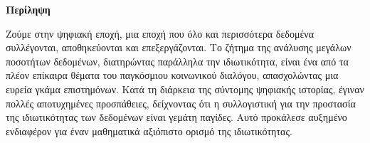 \documentclass[a4paper, 11pt, twoside]{Thesis}  %
\begin{document}
 
 
 
 
 
 

\clearpage  %
\newpage
\thispagestyle{empty}
\mbox{}





\null\vfill

\begin{center}
    \textbf{\Large{Περίληψη}}
\end{center}

Ζούμε στην ψηφιακή εποχή, μια εποχή που όλο και περισσότερα δεδομένα συλλέγονται, αποθηκεύονται και επεξεργάζονται. 
Το ζήτημα της ανάλυσης μεγάλων ποσοτήτων δεδομένων, διατηρώντας παράλληλα την ιδιωτικότητα, είναι ένα από τα πλέον επίκαιρα θέματα του παγκόσμιου κοινωνικού διαλόγου, απασχολώντας μια ευρεία γκάμα επιστημόνων. 
Κατά τη διάρκεια της σύντομης ψηφιακής ιστορίας, έγιναν πολλές αποτυχημένες προσπάθειες, δείχνοντας ότι η συλλογιστική για την προστασία της ιδιωτικότητας των δεδομένων είναι γεμάτη παγίδες. Αυτό προκάλεσε αυξημένο ενδιαφέρον για έναν μαθηματικά αξιόπιστο ορισμό της ιδιωτικότητας.
\end{document}
